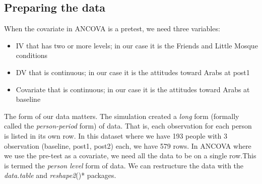 \documentclass[
  11pt,
]{book}
\providecommand{\tightlist}{%
  \setlength{\itemsep}{0pt}\setlength{\parskip}{0pt}}
\begin{document}
\hypertarget{preparing-the-data-1}{%
\subsection{Preparing the data}\label{preparing-the-data-1}}

When the covariate in ANCOVA is a pretest, we need three variables:

\begin{itemize}
\tightlist
\item
  IV that has two or more levels; in our case it is the Friends and Little Mosque conditions
\item
  DV that is continuous; in our case it is the attitudes toward Arabs at post1
\item
  Covariate that is continuous; in our case it is the attitudes toward Arabs at baseline
\end{itemize}

The form of our data matters. The simulation created a \emph{long} form (formally called the \emph{person-period} form) of data. That is, each observation for each person is listed in its own row. In this dataset where we have 193 people with 3 observation (baseline, post1, post2) each, we have 579 rows. In ANCOVA where we use the pre-test as a covariate, we need all the data to be on a single row.This is termed the \emph{person level} form of data. We can restructure the data with the \emph{data.table} and \emph{reshape2}()* packages.
\end{document}
